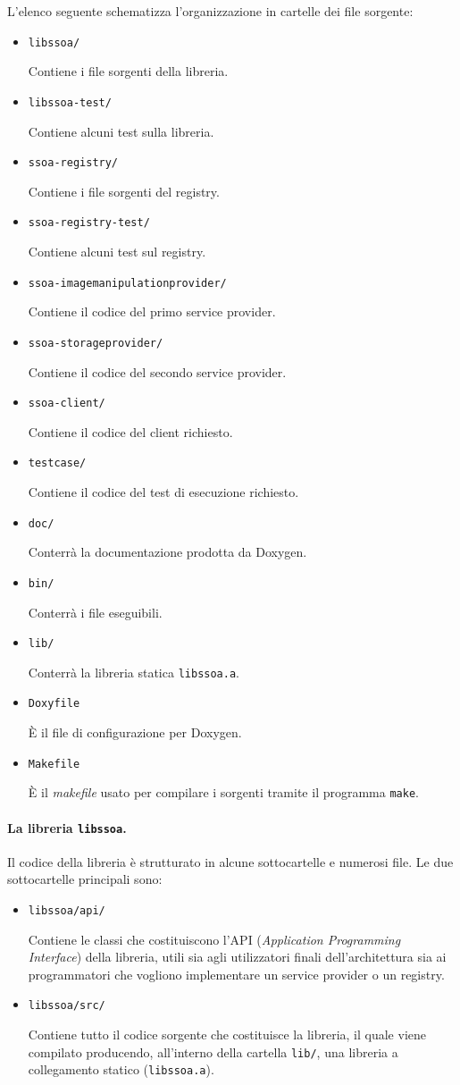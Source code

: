 \documentclass[a4paper,twoside]{article}
\newcommand*\file{\texttt}
\begin{document}
L'elenco seguente schematizza l'organizzazione in cartelle dei file sorgente:
\begin{itemize}
\item \file{libssoa/}\par
Contiene i file sorgenti della libreria.
\item \file{libssoa-test/}\par
Contiene alcuni test sulla libreria.
\item \file{ssoa-registry/}\par
Contiene i file sorgenti del registry.
\item \file{ssoa-registry-test/}\par
Contiene alcuni test sul registry.
\item \file{ssoa-imagemanipulationprovider/}\par
Contiene il codice del primo service provider.
\item \file{ssoa-storageprovider/}\par
Contiene il codice del secondo service provider.
\item \file{ssoa-client/}\par
Contiene il codice del client richiesto.
\item \file{testcase/}\par
Contiene il codice del test di esecuzione richiesto.
\item \file{doc/}\par
Conterrà la documentazione prodotta da Doxygen.
\item \file{bin/}\par
Conterrà i file eseguibili.
\item \file{lib/}\par
Conterrà la libreria statica \file{libssoa.a}.
\item \file{Doxyfile}\par
È il file di configurazione per Doxygen.
\item \file{Makefile}\par
È il \emph{makefile} usato per compilare i sorgenti tramite il programma \file{make}.
\end{itemize}

\paragraph{La libreria \file{libssoa}.}
Il codice della libreria è strutturato in alcune sottocartelle e numerosi file. Le due sottocartelle principali sono:
\begin{itemize}
\item \file{libssoa/api/}\par
Contiene le classi che costituiscono l'API (\emph{Application Programming Interface}) della libreria, utili sia agli utilizzatori finali dell'architettura sia ai programmatori che vogliono implementare un service provider o un registry.
\item \file{libssoa/src/}\par
Contiene tutto il codice sorgente che costituisce la libreria, il quale viene compilato producendo, all'interno della cartella \file{lib/}, una libreria a collegamento statico (\file{libssoa.a}).
\end{itemize}
\end{document}
